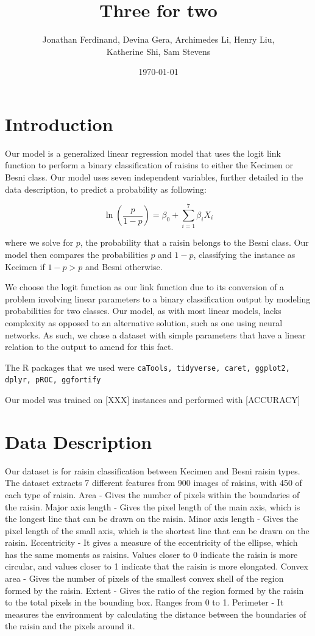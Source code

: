 \documentclass{article}
\title{Three for two}
\author{Jonathan Ferdinand, Devina Gera, Archimedes Li, Henry Liu, \\Katherine Shi, Sam Stevens}
\date{\today}
\begin{document}
\maketitle

\section{Introduction}
Our model is a generalized linear regression model that uses the logit link function to perform a binary classification of raisins to either the Kecimen or Besni class. Our model uses seven independent variables, further detailed in the data description, to predict a probability as following:

$$\ln \left( \frac{p}{1-p}\right) = \beta_0 + \sum_{i=1}^{7} \beta_i X_i$$

where we solve for $p$, the probability that a raisin belongs to the Besni class. Our model then compares the probabilities $p$ and $1-p$, classifying the instance as Kecimen if $1-p > p$ and Besni otherwise.

We choose the logit function as our link function due to its conversion of a problem involving linear parameters to a binary classification output by modeling probabilities for two classes. Our model, as with most linear models, lacks complexity as opposed to an alternative solution, such as one using neural networks. As such, we chose a dataset with simple parameters that have a linear relation to the output to amend for this fact.

The R packages that we used were \texttt{caTools, tidyverse, caret, ggplot2, dplyr, pROC, ggfortify}

Our model was trained on [XXX] instances and performed with [ACCURACY]%

\section{Data Description}
Our dataset is for raisin classification between Kecimen and Besni raisin types.  The dataset extracts 7 different features from 900 images of raisins, with 450 of each type of raisin.
Area - Gives the number of pixels within the boundaries of the raisin.
Major axis length - Gives the pixel length of the main axis, which is the longest line that can be drawn on the raisin.
Minor axis length - Gives the pixel length of the small axis, which is the shortest line that can be drawn on the raisin.
Eccentricity - It gives a measure of the eccentricity of the ellipse, which has the same moments as raisins.  Values closer to 0 indicate the raisin is more circular, and values closer to 1 indicate that the raisin is more elongated.
Convex area - Gives the number of pixels of the smallest convex shell of the region formed by the raisin.
Extent - Gives the ratio of the region formed by the raisin to the total pixels in the bounding box.  Ranges from 0 to 1.
Perimeter - It measures the environment by calculating the distance between the boundaries of the raisin and the pixels around it.
\end{document}
